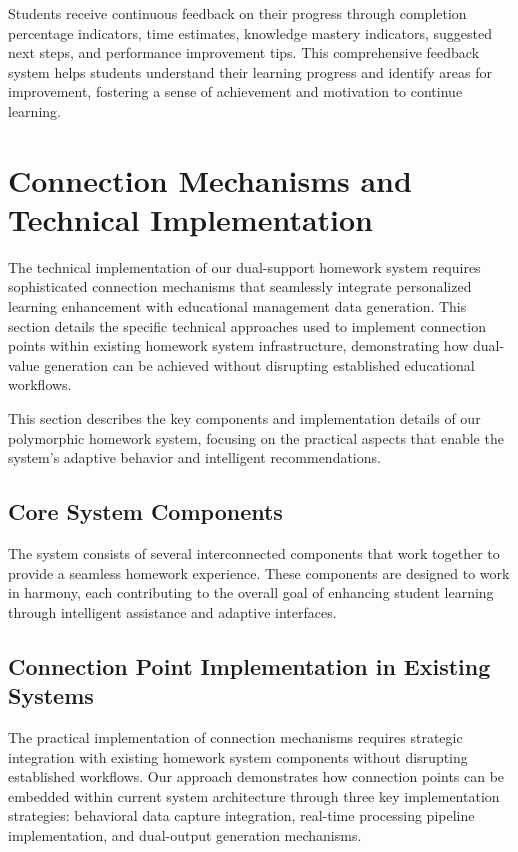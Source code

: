 \documentclass[conference]{IEEEtran}
\begin{document}
\begin{IEEEkeywords}
Students receive continuous feedback on their progress through completion percentage indicators, time estimates, knowledge mastery indicators, suggested next steps, and performance improvement tips. This comprehensive feedback system helps students understand their learning progress and identify areas for improvement, fostering a sense of achievement and motivation to continue learning.

\section{Connection Mechanisms and Technical Implementation}

The technical implementation of our dual-support homework system requires sophisticated connection mechanisms that seamlessly integrate personalized learning enhancement with educational management data generation. This section details the specific technical approaches used to implement connection points within existing homework system infrastructure, demonstrating how dual-value generation can be achieved without disrupting established educational workflows.

This section describes the key components and implementation details of our polymorphic homework system, focusing on the practical aspects that enable the system's adaptive behavior and intelligent recommendations.



\subsection{Core System Components}

The system consists of several interconnected components that work together to provide a seamless homework experience. These components are designed to work in harmony, each contributing to the overall goal of enhancing student learning through intelligent assistance and adaptive interfaces.

\subsection{Connection Point Implementation in Existing Systems}

The practical implementation of connection mechanisms requires strategic integration with existing homework system components without disrupting established workflows. Our approach demonstrates how connection points can be embedded within current system architecture through three key implementation strategies: behavioral data capture integration, real-time processing pipeline implementation, and dual-output generation mechanisms.


\end{IEEEkeywords}
\end{document}
